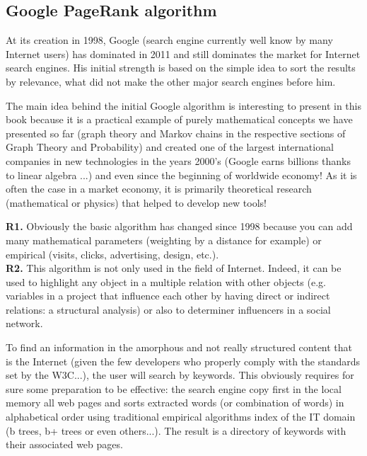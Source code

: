 	\subsection{Google PageRank algorithm}\label{google pagerank algorithm}
	At its creation in 1998, Google (search engine currently well know by many Internet users) has dominated in 2011 and still dominates the market for Internet search engines. His initial strength is based on the simple idea to sort the results by relevance, what did not make the other major search engines before him.
	
	The main idea behind the initial Google algorithm is interesting to present in this book because it is a practical example of purely mathematical concepts we have presented so far (graph theory and Markov chains in the respective sections of Graph Theory and Probability) and created one of the largest international companies in new technologies in the years 2000's (Google earns billions thanks to linear algebra ...) and even since the beginning of worldwide economy! As it is often the case in a market economy, it is primarily theoretical research (mathematical or physics) that helped to develop new tools!
	
	\begin{tcolorbox}[title=Remark,colframe=black,arc=10pt]
	\textbf{R1.} Obviously the basic algorithm has changed since 1998 because you can add many mathematical parameters (weighting by a distance for example) or empirical (visits, clicks, advertising, design, etc.).\\
	
	\textbf{R2.} This algorithm is not only used in the field of Internet. Indeed, it can be used to highlight any object in a multiple relation with other objects (e.g. variables in a project that influence each other by having direct or indirect relations: a structural analysis) or also to determiner influencers in a social network.
	\end{tcolorbox}
	
	To find an information in the amorphous and not really structured content that is the Internet (given the few developers who properly comply with the standards set by the W3C...), the user will search by keywords. This obviously requires for sure some preparation to be effective: the search engine copy first in the local memory all web pages and sorts extracted words (or combination of words) in alphabetical order using traditional empirical algorithms index of the IT domain (b trees, b+ trees or even others...). The result is a directory of keywords with their associated web pages.
	
